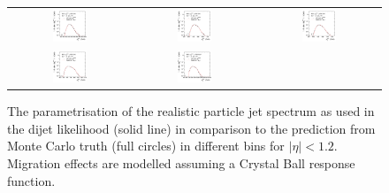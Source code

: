 \begin{figure}[ht]
\begin{tabular}{ccc}
    \includegraphics[width=0.3\textwidth]{figures/ResFit_Spring10QCDFlat_CB_Eta0_Spectrum_PtBin6} &
    \includegraphics[width=0.3\textwidth]{figures/ResFit_Spring10QCDFlat_CB_Eta0_Spectrum_PtBin7} &
    \includegraphics[width=0.3\textwidth]{figures/ResFit_Spring10QCDFlat_CB_Eta0_Spectrum_PtBin8} \\

    \includegraphics[width=0.3\textwidth]{figures/ResFit_Spring10QCDFlat_CB_Eta0_Spectrum_PtBin9} &
    \includegraphics[width=0.3\textwidth]{figures/ResFit_Spring10QCDFlat_CB_Eta0_Spectrum_PtBin10} & \\
  \end{tabular}
\caption{The parametrisation of the realistic particle jet \pt spectrum as used in the dijet likelihood (solid line) in comparison to the prediction from Monte Carlo truth (full circles) in different \pt bins for \mbox{$|\eta|<1.2$}. Migration effects are modelled assuming a Crystal Ball response function.}
\label{fig:ResFit:App:CB:Spectrum}
\end{figure}


